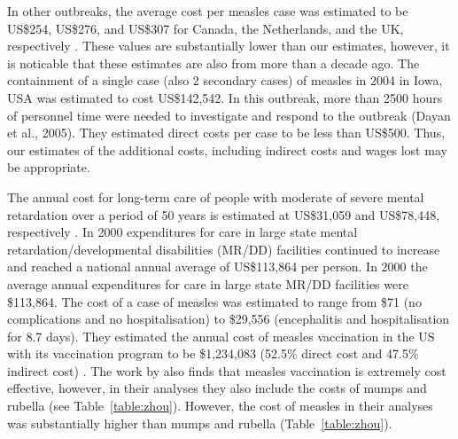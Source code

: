 \documentclass{article}
\begin{document}
\begin{itemize}
In other outbreaks, the average cost per measles case was estimated to be US\$254, US\$276, and US\$307 for Canada, the Netherlands, and the UK, respectively  \citep{carabin2}. These values are substantially lower than our estimates, however, it is noticable that these estimates are also from more than a decade ago. The containment of a single case (also 2 secondary cases) of measles in 2004 in Iowa, USA was estimated to cost US\$142,542. In this outbreak, more than 2500 hours of personnel time were needed to investigate and respond to the outbreak (Dayan et al., 2005). They estimated direct costs per case to be less than US\$500. Thus, our estimates of the additional costs, including indirect costs and wages lost may be appropriate.

The annual cost for long-term care of people with moderate of severe mental retardation over a period of 50 years is estimated at US\$31,059 and US\$78,448, respectively \citep{prouty1}. In 2000 expenditures for care in large state mental retardation/developmental disabilities (MR/DD) facilities continued to increase and reached a national annual average of US\$113,864 per person. In 2000 the average annual expenditures for care in large state MR/DD facilities were \$113,864. The cost of a case of measles was estimated to range from \$71 (no complications and no hospitalisation) to \$29,556 (encephalitis and hospitalisation for 8.7 days). They estimated the annual cost of measles vaccination in the US with its vaccination program to be \$1,234,083 (52.5\% direct cost and 47.5\% indirect cost) \citep{zhou4}. The work by \citep{zhou4} also finds that measles vaccination is extremely cost effective, however, in their analyses they also include the costs of mumps and rubella (see Table~\ref{table:zhou}). However, the cost of measles in their analyses was substantially higher than mumps and rubella (Table~\ref{table:zhou}).


\end{itemize}
\end{document}
